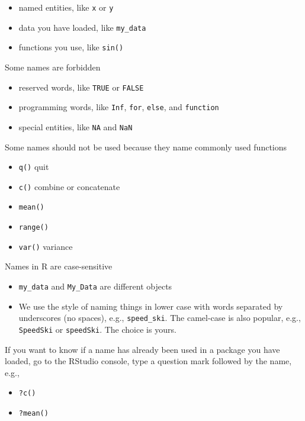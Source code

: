 \documentclass[
]{book}
\providecommand{\tightlist}{%
  \setlength{\itemsep}{0pt}\setlength{\parskip}{0pt}}
\begin{document}
\begin{itemize}
\tightlist
\item
  named entities, like \texttt{x} or \texttt{y}\\
\item
  data you have loaded, like \texttt{my\_data}
\item
  functions you use, like \texttt{sin()}
\end{itemize}

Some names are forbidden

\begin{itemize}
\tightlist
\item
  reserved words, like \texttt{TRUE} or \texttt{FALSE}\\
\item
  programming words, like \texttt{Inf}, \texttt{for}, \texttt{else}, and \texttt{function}\\
\item
  special entities, like \texttt{NA} and \texttt{NaN}
\end{itemize}

Some names should not be used because they name commonly used functions

\begin{itemize}
\tightlist
\item
  \texttt{q()} quit
\item
  \texttt{c()} combine or concatenate
\item
  \texttt{mean()}
\item
  \texttt{range()}
\item
  \texttt{var()} variance
\end{itemize}

Names in R are case-sensitive

\begin{itemize}
\tightlist
\item
  \texttt{my\_data} and \texttt{My\_Data} are different objects
\item
  We use the style of naming things in lower case with words separated by underscores (no spaces), e.g., \texttt{speed\_ski}. The camel-case is also popular, e.g., \texttt{SpeedSki} or \texttt{speedSki}. The choice is yours.
\end{itemize}

If you want to know if a name has already been used in a package you have loaded, go to the RStudio console, type a question mark followed by the name, e.g.,

\begin{itemize}
\tightlist
\item
  \texttt{?c()}
\item
  \texttt{?mean()}
\end{itemize}
\end{document}
